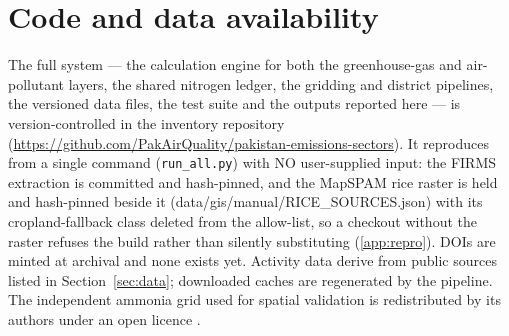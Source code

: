\documentclass[5p,times,authoryear]{elsarticle}
\begin{document}
\section*{Code and data availability}
The full system --- the calculation engine for both the greenhouse-gas and
air-pollutant layers, the shared nitrogen ledger, the gridding and district pipelines,
the versioned data files, the test suite and the outputs reported here --- is
version-controlled in the inventory repository
(\url{https://github.com/PakAirQuality/pakistan-emissions-sectors}). It reproduces from a
single command (\texttt{run\_all.py}) with NO user-supplied input: the FIRMS extraction
is committed and hash-pinned, and the MapSPAM rice raster is held and hash-pinned
beside it (data/gis/manual/RICE\_SOURCES.json) with its cropland-fallback class
deleted from the allow-list, so a checkout without the raster refuses the build
rather than silently substituting (\ref{app:repro}).
DOIs are minted at archival and none exists yet. Activity data derive
from public sources listed in Section~\ref{sec:data}; downloaded caches are
regenerated by the pipeline. The independent ammonia grid used for spatial validation
is redistributed by its authors under an open licence \citep{sanh2026data}.




\appendix
\renewcommand{\thetable}{\arabic{table}}%
\renewcommand{\thefigure}{\arabic{figure}}%

\end{document}
